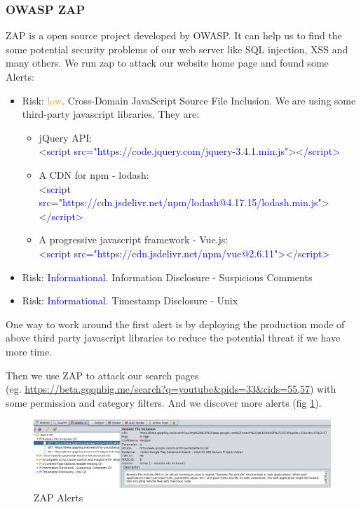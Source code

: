 \documentclass[12pt, a4paper]{article}
\newcommand{\code}[1]{\texttt{#1}}
\begin{document}
\subsubsection{OWASP ZAP}
ZAP is a open source project developed by OWASP. It can help us to find the some potential security problems of our web server like SQL injection, XSS and many others.
We run zap to attack our website home page and found some Alerts:
\begin{itemize}
    \item Risk: \textcolor{orange}{low}. Cross-Domain JavaScript Source File Inclusion. We are using some third-party javascript libraries. They are:
    \begin{itemize}
        \item jQuery API:\\ \textcolor{blue}{<script src="https://code.jquery.com/jquery-3.4.1.min.js"></script>}
        \item A CDN for npm - lodash:\\ \textcolor{blue}{<script src="https://cdn.jsdelivr.net/npm/lodash@4.17.15/lodash.min.js"></script>}
        \item A progressive javascript framework - Vue.js:\\ \textcolor{blue}{<script src="https://cdn.jsdelivr.net/npm/vue@2.6.11"></script>}
    \end{itemize}
    \item Risk: \textcolor{blue}{Informational}. Information Disclosure - Suspicious Comments
    \item Risk: \textcolor{blue}{Informational}. Timestamp Disclosure - Unix
\end{itemize}
One way to work around the first alert is by deploying the production mode of above third party javascript libraries to reduce the potential threat if we have more time.

Then we use ZAP to attack our search pages \\(eg. \url{ https://beta.gqqnbig.me/search?q=youtube&pids=33&cids=55,57}) with some permission and category filters.
And we discover more alerts (fig \ref{fig:zap-alerts}).

\begin{figure}[H]
\centering
\includegraphics[width=\textwidth, frame]{zap_alerts.png}
\caption{ZAP Alerts}
\label{fig:zap-alerts}
\end{figure}
\end{document}
